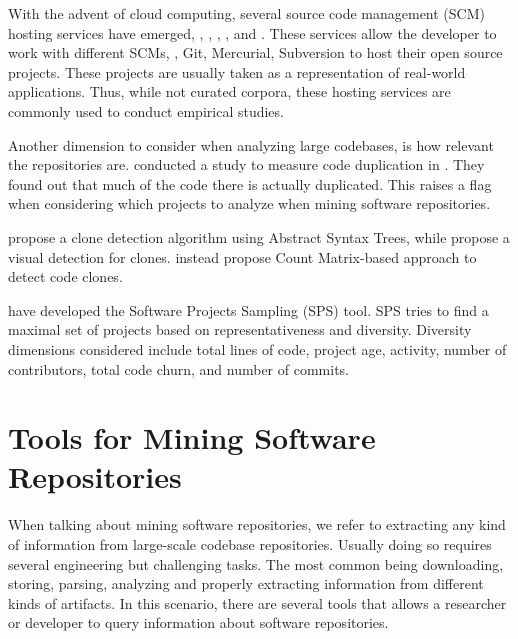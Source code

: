 With the advent of cloud computing,
several source code management (SCM) hosting services have emerged, \eg,
\github, \gitlab, \bitbucket, and \sourceforge.
These services allow the developer to work with different SCMs, \eg,
Git, Mercurial, Subversion to host their open source projects.
These projects are usually taken as a representation of
real-world applications.
Thus, while not curated corpora, these hosting services are
commonly used to conduct empirical studies.


Another dimension to consider when analyzing large codebases, is how relevant the repositories are.
\cite{lopesDeJaVuMapCode2017} conducted a study to measure code duplication in \github{}.
They found out that much of the code there is actually duplicated.
This raises a flag when considering which projects to analyze when mining software repositories.

\cite{baxterCloneDetectionUsing1998} propose a clone detection algorithm using Abstract Syntax Trees,
while \cite{riegerVisualDetectionDuplicated} propose a visual detection for clones.
\cite{yuanCMCDCountMatrix2011,chenReplicationReproductionCode} instead propose Count Matrix-based approach to detect code clones.

\cite{nagappanDiversitySoftwareEngineering2013} have developed the Software Projects Sampling (SPS) tool.
SPS tries to find a maximal set of projects based on representativeness and diversity.
Diversity dimensions considered include total lines of code,
project age, activity, number of contributors, total code churn,
and number of commits.

\section{Tools for Mining Software Repositories}
\label{sec:lr:mining}

When talking about mining software repositories,
we refer to extracting any kind of information from large-scale codebase repositories. 
Usually doing so requires several engineering but challenging tasks.
The most common being downloading, storing, parsing, analyzing and
properly extracting information from different kinds of artifacts.
In this scenario, there are several tools that allows a researcher or developer to query information about software repositories.

